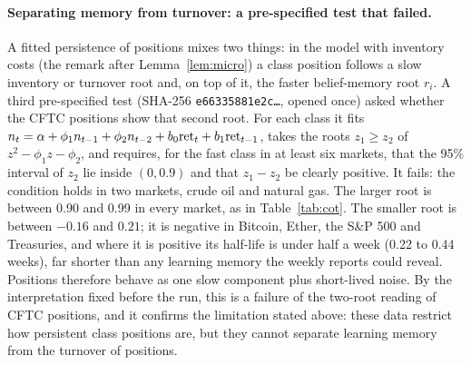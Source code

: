 \documentclass[12pt]{article}
\theoremstyle{definition}
\theoremstyle{remark}
\begin{document}
\paragraph{Separating memory from turnover: a pre-specified test that failed.} A fitted persistence of positions mixes two things: in the model with inventory costs (the remark after Lemma~\ref{lem:micro}) a class position follows a slow inventory or turnover root and, on top of it, the faster belief-memory root $r_i$. A third pre-specified test (SHA-256 \texttt{e66335881e2c\ldots}, opened once) asked whether the CFTC positions show that second root. For each class it fits $n_t=\alpha+\phi_1n_{t-1}+\phi_2n_{t-2}+b_0{\rm ret}_t+b_1{\rm ret}_{t-1}$, takes the roots $z_1\ge z_2$ of $z^2-\phi_1z-\phi_2$, and requires, for the fast class in at least six markets, that the 95\% interval of $z_2$ lie inside $(0,0.9)$ and that $z_1-z_2$ be clearly positive. It fails: the condition holds in two markets, crude oil and natural gas. The larger root is between 0.90 and 0.99 in every market, as in Table~\ref{tab:cot}. The smaller root is between $-0.16$ and $0.21$; it is negative in Bitcoin, Ether, the S\&P 500 and Treasuries, and where it is positive its half-life is under half a week (0.22 to 0.44 weeks), far shorter than any learning memory the weekly reports could reveal. Positions therefore behave as one slow component plus short-lived noise. By the interpretation fixed before the run, this is a failure of the two-root reading of CFTC positions, and it confirms the limitation stated above: these data restrict how persistent class positions are, but they cannot separate learning memory from the turnover of positions.
\end{document}
